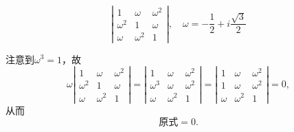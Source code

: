 \begin{frame} 

\begin{testexample}
  $$
  \left|
    \begin{array}{ccc}
      1&\omega&\omega^2\\
      \omega^2&1&\omega\\
      \omega&\omega^2&1
    \end{array}
  \right|, \quad \omega = -\frac12 + i \frac{\sqrt{3}}2
  $$
\end{testexample}\pause

\begin{jie}
 注意到$\omega^3=1$，故
$$
\omega \left|
  \begin{array}{ccc}
    1&\omega&\omega^2\\
    \omega^2&1&\omega\\
    \omega&\omega^2&1
  \end{array}
\right| = \left|
  \begin{array}{ccc}
    1&\omega&\omega^2\\
    \omega^3&\omega&\omega^2\\
    \omega&\omega^2&1
  \end{array}
\right| = \left|
  \begin{array}{ccc}
    1&\omega&\omega^2\\
    1&\omega&\omega^2\\
    \omega&\omega^2&1
  \end{array}
\right| = 0,
$$
从而
$$
\mbox{原式}=0.
$$
\end{jie}
\end{frame}

